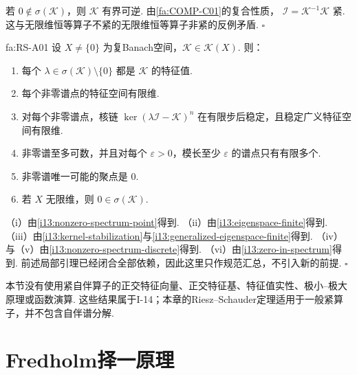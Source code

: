 \begin{FAProof}
若 \(\displaystyle0\notin\sigma(\mathcal K)\)，则 \(\displaystyle \mathcal K\) 有界可逆. 由\autoref{fa:COMP-C01}的复合性质，
\(\displaystyle \mathcal I = \mathcal K^{-1}\mathcal K\)
紧. 这与无限维恒等算子不紧的无限维恒等算子非紧的反例矛盾.
\hfill\(\square\)
\end{FAProof}

\begin{FATheorem}{fa:RS-A01}
设 \(\displaystyle X\neq\{0\}\) 为复Banach空间，\(\displaystyle \mathcal K\in\mathcal K(X)\). 则：
\begin{enumerate}[label=\textup{(\roman*)}]
\item 每个 \(\displaystyle \lambda\in\sigma(\mathcal K)\setminus\{0\}\) 都是 \(\displaystyle \mathcal K\) 的特征值.
\item 每个非零谱点的特征空间有限维.
\item 对每个非零谱点，核链 \(\displaystyle \ker(\lambda\mathcal I-\mathcal K)^n\) 在有限步后稳定，且稳定广义特征空间有限维.
\item 非零谱至多可数，并且对每个 \(\displaystyle \varepsilon>0\)，模长至少 \(\displaystyle \varepsilon\) 的谱点只有有限多个.
\item 非零谱唯一可能的聚点是 \(\displaystyle0\).
\item 若 \(\displaystyle X\) 无限维，则 \(\displaystyle0\in\sigma(\mathcal K)\).
\end{enumerate}
\end{FATheorem}

\begin{FAProof}
（i）由\autoref{i13:nonzero-spectrum-point}得到. （ii）由\autoref{i13:eigenspace-finite}得到. （iii）由\autoref{i13:kernel-stabilization}与\autoref{i13:generalized-eigenspace-finite}得到. （iv）与（v）由\autoref{i13:nonzero-spectrum-discrete}得到. （vi）由\autoref{i13:zero-in-spectrum}得到. 前述局部引理已经闭合全部依赖，因此这里只作规范汇总，不引入新的前提.
\hfill\(\square\)
\end{FAProof}

\begin{FARemark}[I-14边界]
本节没有使用紧自伴算子的正交特征向量、正交特征基、特征值实性、极小--极大原理或函数演算. 这些结果属于I-14；本章的Riesz--Schauder定理适用于一般紧算子，并不包含自伴谱分解.
\end{FARemark}

\section{Fredholm择一原理}\label{sec:i13-fredholm}

